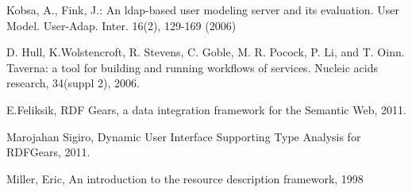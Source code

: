 \begin{thebibliography}{99}
 Kobsa, A., Fink, J.: An ldap-based user modeling server and its evaluation. User Model. User-Adap.
Inter. 16(2), 129-169 (2006)

 D. Hull, K.Wolstencroft, R. Stevens, C. Goble, M. R. Pocock, P. Li, and T. Oinn.
Taverna: a tool for building and running workflows of services. Nucleic acids
research, 34(suppl 2), 2006.

 E.Feliksik, RDF Gears, a data integration framework for the Semantic Web, 2011.

 Marojahan Sigiro, Dynamic User Interface Supporting Type Analysis for RDFGears, 2011.

 Miller, Eric, An introduction to the resource description framework, 1998

\end{thebibliography}

